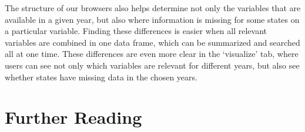 \documentclass[DIV=calc, paper=a4, fontsize=10pt, twocolumn]{scrartcl}\usepackage[]{graphicx}\usepackage[]{color}
\begin{document}
\par The structure of our browsers also helps determine not only the variables that are available in a given year, but also where information is missing for some states on a particular variable. Finding these differences is easier when all relevant variables are combined in one data frame, which can be summarized and searched all at one time. These differences are even more clear in the `visualize' tab, where users can see not only which variables are relevant for different years, but also see whether states have missing data in the chosen years.  




\section*{Further Reading}


\end{document}
